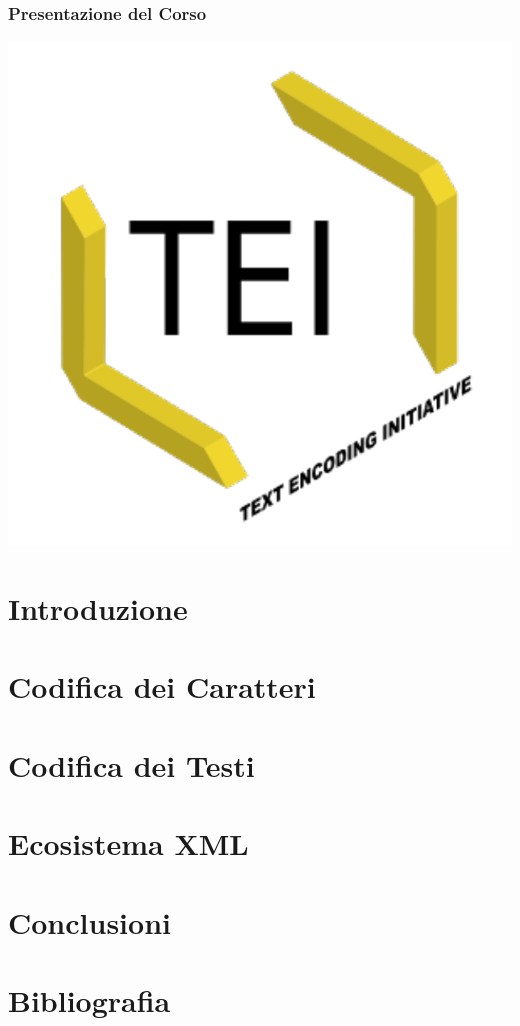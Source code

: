 \documentclass{beamer}
\begin{document}
\begin{frame}
	\frametitle{Presentazione del Corso}
	\addtocounter{nframe}{1}

	\begin{center}
		\includegraphics[width=.5\textwidth]{../imgs/tei-r.pdf}
	\end{center}


\end{frame}



\section{Introduzione}


\section{Codifica dei Caratteri}


\section{Codifica dei Testi}


\section{Ecosistema XML}


\section{Conclusioni}


\section*{Bibliografia}

\end{document}

